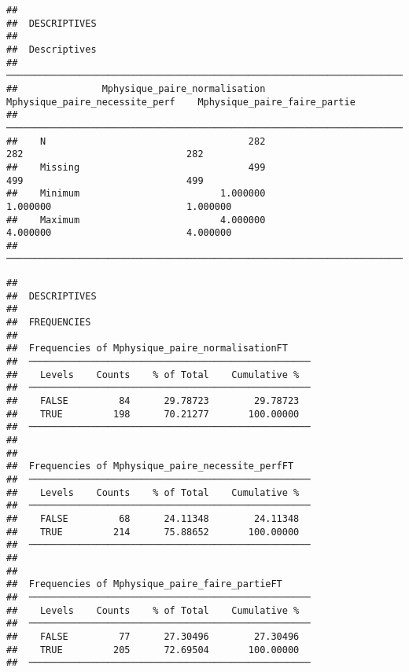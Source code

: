 \documentclass[
]{article}
\begin{document}
\begin{verbatim}
## 
##  DESCRIPTIVES
## 
##  Descriptives                                                                                                   
##  ────────────────────────────────────────────────────────────────────────────────────────────────────────────── 
##               Mphysique_paire_normalisation    Mphysique_paire_necessite_perf    Mphysique_paire_faire_partie   
##  ────────────────────────────────────────────────────────────────────────────────────────────────────────────── 
##    N                                    282                               282                             282   
##    Missing                              499                               499                             499   
##    Minimum                         1.000000                          1.000000                        1.000000   
##    Maximum                         4.000000                          4.000000                        4.000000   
##  ──────────────────────────────────────────────────────────────────────────────────────────────────────────────
\end{verbatim}

\begin{verbatim}
## 
##  DESCRIPTIVES
## 
##  FREQUENCIES
## 
##  Frequencies of Mphysique_paire_normalisationFT     
##  ────────────────────────────────────────────────── 
##    Levels    Counts    % of Total    Cumulative %   
##  ────────────────────────────────────────────────── 
##    FALSE         84      29.78723        29.78723   
##    TRUE         198      70.21277       100.00000   
##  ────────────────────────────────────────────────── 
## 
## 
##  Frequencies of Mphysique_paire_necessite_perfFT    
##  ────────────────────────────────────────────────── 
##    Levels    Counts    % of Total    Cumulative %   
##  ────────────────────────────────────────────────── 
##    FALSE         68      24.11348        24.11348   
##    TRUE         214      75.88652       100.00000   
##  ────────────────────────────────────────────────── 
## 
## 
##  Frequencies of Mphysique_paire_faire_partieFT      
##  ────────────────────────────────────────────────── 
##    Levels    Counts    % of Total    Cumulative %   
##  ────────────────────────────────────────────────── 
##    FALSE         77      27.30496        27.30496   
##    TRUE         205      72.69504       100.00000   
##  ──────────────────────────────────────────────────
\end{verbatim}
\end{document}

